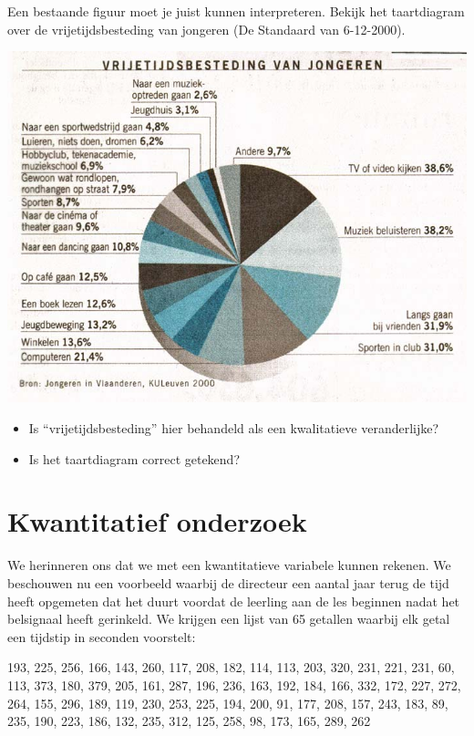 \documentclass[12pt,twoside]{article}
\begin{document}
\begin{oefening}
Een bestaande figuur moet je juist kunnen interpreteren. Bekijk het taartdiagram over de
vrijetijdsbesteding van jongeren (De Standaard van 6-12-2000).

\begin{center}
  \includegraphics[width=1\textwidth]{cirkeldiagram-vrijetijdsbesteding}
\end{center}

\begin{itemize}
  \item Is “vrijetijdsbesteding” hier behandeld als een kwalitatieve veranderlijke?
  \item Is het taartdiagram correct getekend?
\end{itemize}
\end{oefening}

\pagebreak
\section{Kwantitatief onderzoek}

We herinneren ons dat we met een kwantitatieve variabele kunnen rekenen. We beschouwen nu een voorbeeld waarbij de directeur een aantal jaar terug de tijd heeft opgemeten dat het duurt voordat de leerling aan de les beginnen nadat het belsignaal heeft gerinkeld. We krijgen een lijst van 65 getallen waarbij elk getal een tijdstip in seconden voorstelt:

193, 225, 256, 166, 143, 260, 117, 208, 182, 114, 113, 203, 320, 231, 221, 231, 60, 113, 373, 180, 379, 205, 161, 287, 196, 236, 163, 192, 184, 166, 332, 172, 227, 272, 264, 155, 296, 189, 119, 230, 253, 225, 194, 200, 91, 177, 208, 157, 243, 183, 89, 235, 190, 223, 186, 132, 235, 312, 125, 258, 98, 173, 165, 289, 262
\end{document}
